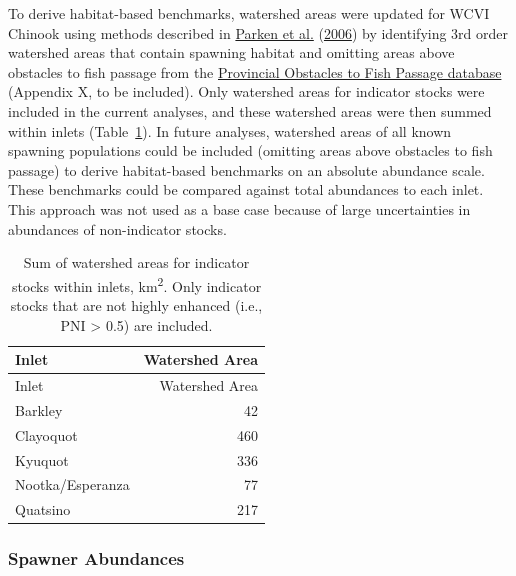 \documentclass[11pt]{book}
\begin{document}
To derive habitat-based benchmarks, watershed areas were updated for WCVI Chinook using methods described in \protect\hyperlink{ref-parkenHabitatbasedMethodsEstimate2006}{Parken et al.} (\protect\hyperlink{ref-parkenHabitatbasedMethodsEstimate2006}{2006}) by identifying 3rd order watershed areas that contain spawning habitat and omitting areas above obstacles to fish passage from the \href{https://catalogue.data.gov.bc.ca/dataset/provincial-obstacles-to-fish-passage}{Provincial Obstacles to Fish Passage database} (Appendix X, to be included). Only watershed areas for indicator stocks were included in the current analyses, and these watershed areas were then summed within inlets (Table~\ref{tab:chinook-WA}). In future analyses, watershed areas of all known spawning populations could be included (omitting areas above obstacles to fish passage) to derive habitat-based benchmarks on an absolute abundance scale. These benchmarks could be compared against total abundances to each inlet. This approach was not used as a base case because of large uncertainties in abundances of non-indicator stocks.
\begin{longtable}[]{@{}lr@{}}
\caption{\label{tab:chinook-WA}Sum of watershed areas for indicator stocks within inlets, km\textsuperscript{2}. Only indicator stocks that are not highly enhanced (i.e., PNI \textgreater{} 0.5) are included.}\tabularnewline
\toprule
Inlet & Watershed Area \\
\midrule
\endfirsthead
\toprule
Inlet & Watershed Area \\
\midrule
\endhead
Barkley & 42 \\
Clayoquot & 460 \\
Kyuquot & 336 \\
Nootka/Esperanza & 77 \\
Quatsino & 217 \\
\bottomrule
\end{longtable}
\hypertarget{spawner-abundances}{%
\subsubsection{Spawner Abundances}\label{spawner-abundances}}
\end{document}
